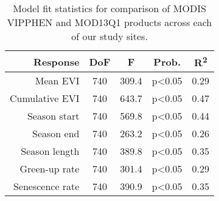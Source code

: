 \begin{table}[h]
\centering
\begin{tabular}{rcccc}
  \hline
Response & DoF & F & Prob. & R\textsuperscript{2} \\ 
  \hline
Mean EVI & 740 & 309.4 & p<0.05 & 0.29 \\ 
  Cumulative EVI & 740 & 643.7 & p<0.05 & 0.47 \\ 
  Season start & 740 & 569.8 & p<0.05 & 0.44 \\ 
  Season end & 740 & 263.2 & p<0.05 & 0.26 \\ 
  Season length & 740 & 389.8 & p<0.05 & 0.35 \\ 
  Green-up rate & 740 & 301.4 & p<0.05 & 0.29 \\ 
  Senescence rate & 740 & 390.9 & p<0.05 & 0.35 \\ 
   \hline
\end{tabular}
\caption{Model fit statistics for comparison of MODIS VIPPHEN and MOD13Q1 products across each of our study sites.} 
\label{annot_df}
\end{table}

